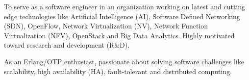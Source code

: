 

\begin{cvparagraph}

To serve as a software engineer in an organization working on latest and cutting edge
technologies like Artificial Intelligence (AI), Software Defined Networking (SDN), OpenFlow,
Network Virtualization (NV), Network Function Virtualization (NFV), OpenStack and
Big Data Analytics. Highly motivated toward research and development (R\&D).

As an Erlang/OTP enthusiast, passionate about solving software challenges like scalability,
high availability (HA), fault-tolerant and distributed computing.
\end{cvparagraph}
